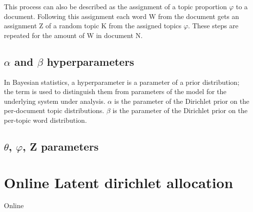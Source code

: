 This process can also be described as the assignment of a topic proportion $\varphi$ to a document. Following this assignment each word W from the document gets an assignment Z of a random topic K from the assigned topics $\varphi$. These steps are repeated for the amount of W in document N.

\subsection{$\alpha$ and $\beta$ hyperparameters} 
In Bayesian statistics, a hyperparameter is a parameter of a prior distribution; the term is used to distinguish them from parameters of the model for the underlying system under analysis. 
$\alpha$ is the parameter of the Dirichlet prior on the per-document topic distributions.
$\beta$ is the parameter of the Dirichlet prior on the per-topic word distribution.

\subsection{$\theta$, $\varphi$, Z parameters}


\section{Online Latent dirichlet allocation}
Online \cite{Hoffman2010OnlineAllocation}